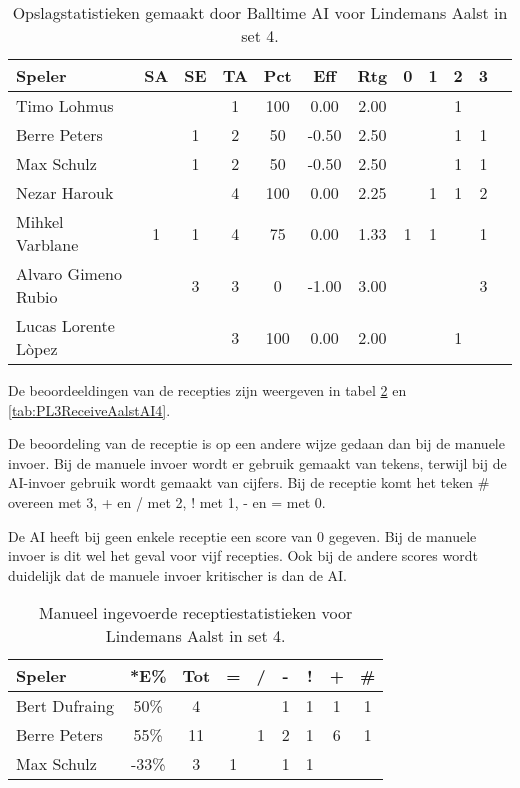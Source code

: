 \begin{table}[ht!]
  \centering
  \scriptsize
  \begin{tabular}{|l|c|c|c|c|c|c|c|c|c|c|c|} \hline
    \textbf{Speler} & SA & SE & TA & Pct & Eff & Rtg & 0 & 1 & 2 & 3  \\ \hline
    Timo Lohmus &  &  & 1 & 100 & 0.00 & 2.00 &   & &  1 &  \\
    Berre Peters &  & 1 & 2 & 50 & -0.50 & 2.50 &   &  & 1 & 1 \\
    Max Schulz &  & 1 & 2 & 50 & -0.50 & 2.50 &   &  & 1 & 1 \\
    Nezar Harouk &  &  & 4 & 100 & 0.00 & 2.25 &   & 1 & 1 & 2 \\
    Mihkel Varblane & 1 & 1 & 4 & 75 & 0.00 & 1.33 & 1 & 1 &   & 1 \\
    Alvaro Gimeno Rubio &  & 3 & 3 & 0 & -1.00 & 3.00 &   &   &  & 3  \\
    Lucas Lorente Lòpez &  &  & 3 & 100 & 0.00 & 2.00 &   &  &  1 &  \\\hline
  \end{tabular}
  \caption[Opslagstatistieken gemaakt door Balltime AI voor Lindemans Aalst in set 4]{\label{tab:PL3ServeAalstAI4}Opslagstatistieken gemaakt door Balltime AI voor Lindemans Aalst in set 4.}
\end{table}

De beoordeeldingen van de recepties zijn weergeven in tabel \ref{tab:PL3ReceiveAalstMan4} en \ref{tab:PL3ReceiveAalstAI4}.

De beoordeling van de receptie is op een andere wijze gedaan dan bij de manuele invoer. Bij de manuele invoer wordt er gebruik gemaakt van tekens, terwijl bij de AI-invoer gebruik wordt gemaakt van cijfers. Bij de receptie komt het teken \# overeen met 3, + en / met 2, ! met 1, - en = met 0.

De AI heeft bij geen enkele receptie een score van 0 gegeven. Bij de manuele invoer is dit wel het geval voor vijf recepties. Ook bij de andere scores wordt duidelijk dat de manuele invoer kritischer is dan de AI.

\begin{table}[ht!]
    \centering
    \scriptsize
    \begin{tabular}{|l|c|c|c|c|c|c|c|c|}
        \hline
        \textbf{Speler} & *E\% & Tot & = & / & - & ! & + & \# \\ \hline
        Bert Dufraing & 50\% & 4 &  &  & 1 & 1 & 1 & 1\\ 
        Berre Peters & 55\% & 11 & & 1 & 2 & 1 & 6 & 1 \\ 
        Max Schulz & -33\% & 3 & 1 &  & 1 & 1 &  & \\ \hline
    \end{tabular}
    \caption[Manueel ingevoerde receptiestatistieken voor Lindemans Aalst in set 4]{\label{tab:PL3ReceiveAalstMan4}Manueel ingevoerde receptiestatistieken voor Lindemans Aalst in set 4.}
\end{table}

